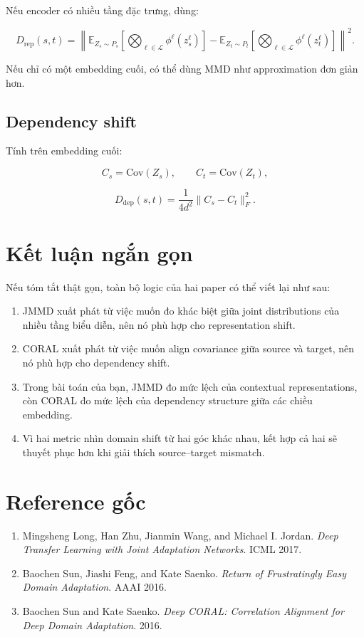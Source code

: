 \documentclass[a4paper]{article}
\begin{document}
Nếu encoder có nhiều tầng đặc trưng, dùng:

\[
D_{\mathrm{rep}}(s,t)
=
\left\|
\mathbb{E}_{Z_s \sim P_s}\left[\bigotimes_{\ell \in \mathcal L}\phi^{\ell}(z_s^{\ell})\right]
-
\mathbb{E}_{Z_t \sim P_t}\left[\bigotimes_{\ell \in \mathcal L}\phi^{\ell}(z_t^{\ell})\right]
\right\|^2.
\]

Nếu chỉ có một embedding cuối, có thể dùng MMD như approximation đơn giản hơn.

\subsection{Dependency shift}

Tính trên embedding cuối:

\[
C_s = \mathrm{Cov}(Z_s),
\qquad
C_t = \mathrm{Cov}(Z_t),
\]

\[
D_{\mathrm{dep}}(s,t)=\frac{1}{4d^2}\|C_s-C_t\|_F^2.
\]

\section{Kết luận ngắn gọn}

Nếu tóm tắt thật gọn, toàn bộ logic của hai paper có thể viết lại như sau:

\begin{enumerate}[label=\arabic*.]
    \item JMMD xuất phát từ việc muốn đo khác biệt giữa joint distributions của nhiều tầng biểu diễn, nên nó phù hợp cho representation shift.
    \item CORAL xuất phát từ việc muốn align covariance giữa source và target, nên nó phù hợp cho dependency shift.
    \item Trong bài toán của bạn, JMMD đo mức lệch của contextual representations, còn CORAL đo mức lệch của dependency structure giữa các chiều embedding.
    \item Vì hai metric nhìn domain shift từ hai góc khác nhau, kết hợp cả hai sẽ thuyết phục hơn khi giải thích source--target mismatch.
\end{enumerate}

\section{Reference gốc}

\begin{enumerate}[label=\arabic*.]
    \item Mingsheng Long, Han Zhu, Jianmin Wang, and Michael I. Jordan. \emph{Deep Transfer Learning with Joint Adaptation Networks}. ICML 2017.
    \item Baochen Sun, Jiashi Feng, and Kate Saenko. \emph{Return of Frustratingly Easy Domain Adaptation}. AAAI 2016.
    \item Baochen Sun and Kate Saenko. \emph{Deep CORAL: Correlation Alignment for Deep Domain Adaptation}. 2016.
\end{enumerate}
\end{document}
